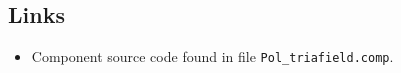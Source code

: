 \subsection*{Links}
\begin{itemize}
  \item Component source code found in file \texttt{Pol\_triafield.comp}.
\end{itemize}
